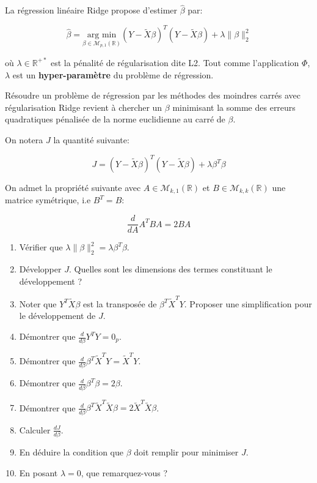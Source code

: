 \documentclass[solutions]{../exercices}
\begin{document}
La régression linéaire Ridge propose d'estimer $\hat{\beta}$ par:

\begin{equation}
	\hat{\beta} = \underset{\beta \in \mathcal{M}_{p,1}(\mathbb{R})}{\text{arg min}} \left(Y - \tilde{X}\beta\right)^T \left(Y - \tilde{X}\beta\right) + \lambda \| \beta \|_2^2
	\label{eqn:ridge-1}
\end{equation}

où $\lambda \in \mathbb{R}^{+*}$ est la pénalité de régularisation dite L2. Tout comme l'application $\Phi$, $\lambda$ est un \textbf{hyper-paramètre} du problème de régression.

Résoudre un problème de régression par les méthodes des moindres carrés avec régularisation Ridge revient à chercher un $\beta$ minimisant la somme des erreurs quadratiques pénalisée de la norme euclidienne au carré de $\beta$.

\begin{exercice}

On notera $J$ la quantité suivante:

\begin{equation}
	J = \left(Y - \tilde{X}\beta\right)^T \left(Y - \tilde{X}\beta\right) + \lambda \beta^T \beta
	\nonumber
\end{equation}

On admet la propriété suivante avec $A \in \mathcal{M}_{k,1}(\mathbb{R})$ et $B \in \mathcal{M}_{k,k}(\mathbb{R})$ une matrice symétrique, i.e $B^T = B$:

\begin{equation}
	\frac{d}{dA} A^T B A = 2 B A
	\nonumber
\end{equation}

\begin{enumerate}
	\item Vérifier que $\lambda \| \beta \|_2^2 = \lambda \beta^T \beta$.
	\item Développer $J$. Quelles sont les dimensions des termes constituant le développement ?
	\item Noter que $Y^T\tilde{X}\beta$ est la transposée de $\beta^T \tilde{X}^T Y$. Proposer une simplification pour le développement de $J$.
	\item Démontrer que $\displaystyle \frac{d}{d\beta} Y^T Y = 0_p$.
	\item Démontrer que $\displaystyle \frac{d}{d\beta} \beta^T \tilde{X}^T Y = \tilde{X}^T Y$.
	\item Démontrer que $\displaystyle \frac{d}{d\beta} \beta^T \beta = 2 \beta$.
	\item Démontrer que $\displaystyle \frac{d}{d\beta} \beta^T \tilde{X}^T \tilde{X} \beta = 2 \tilde{X}^T \tilde{X} \beta$.
	\item Calculer $\displaystyle \frac{dJ}{d\beta}$.
	\item En déduire la condition que $\beta$ doit remplir pour minimiser $J$.
	\item En posant $\lambda = 0$, que remarquez-vous ?
\end{enumerate}

\end{exercice}
\end{document}

